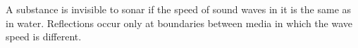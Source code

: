 A substance is invisible to sonar if the speed of sound waves in it
is the same as  in water. Reflections occur only at boundaries
between media in which the wave speed is different.
